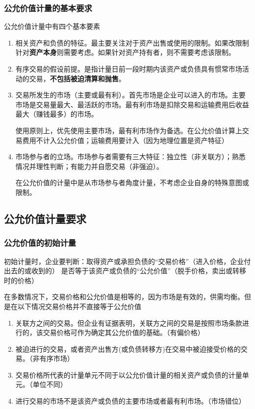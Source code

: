 \documentclass[UTF8,12pt]{ctexart}
\numberwithin{equation}{section} %
\numberwithin{figure}{section}
\numberwithin{table}{section}
\begin{document}
	\subsubsection{公允价值计量的基本要求}
	公允价值计量中有四个基本要素
	\begin{enumerate}
		\item 相关资产和负债的特征。最主要关注对于资产出售或使用的限制。如果改限制针对\textbf{资产本身}则需要考虑。如果针对资产持有者，则不需要考虑该限制。
		
		\item 有序交易的假设前提。是指计量日前一段时期内该资产或负债具有惯常市场活动的交易，\textbf{不包括被迫清算和抛售}。
		
		\item 交易所发生的市场（主要或最有利）。首先市场是企业可以进入的市场。主要市场是交易量最大、最活跃的市场。最有利市场是扣除交易和运输费用后收益最大（赚钱最多）的市场。
		
		使用原则上，优先使用主要市场，最有利市场作为备选。在公允价值计算上交易费用不计入公允价值；运输费用要计入（因为地理位置是资产特征）
		
		\item 市场参与者的立场。市场参与者需要有三大特征：独立性（非关联方）；熟悉情况并理性判断；有能力并自愿交易（非强迫）。
		
		在公允价值的计量中是从市场参与者角度计量，不考虑企业自身的特殊意图或限制。
	\end{enumerate}
	

	\subsection{公允价值计量要求}
	\subsubsection{公允价值的初始计量}
	
	初始计量时，企业要判断：取得资产或承担负债的“交易价格”（进入价格，企业付出去的或收到的） 是否等于该资产或负债的“公允价值”（脱手价格，卖出或转移时的价格）

	在多数情况下，交易价格和公允价值是相等的，因为市场是有效的，供需均衡。但是在以下情况交易价格并不直接等于公允价值
	\begin{enumerate}
		\item 关联方之间的交易。但企业有证据表明，关联方之间的交易是按照市场条款进行的，该交易价格可作为确定其公允价值的基础。（有偏价格）
		
		\item 被迫进行的交易，或者资产出售方(或负债转移方)在交易中被迫接受价格的交易。（非有序市场）
		
		\item 交易价格所代表的计量单元不同于以公允价值计量的相关资产或负债的计量单元。（单位不同）
		
		\item 进行交易的市场不是该资产或负债的主要市场或者最有利市场。（市场错位）
	\end{enumerate}
	
\end{document}
